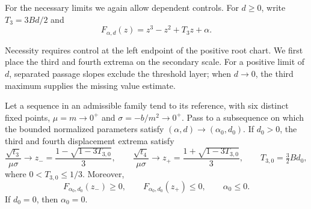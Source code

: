 For the necessary limits we again allow dependent controls.
For $d\ge0$, write $T_3=3Bd/2$ and
\[ F_{\alpha,d}(z)=z^3-z^2+T_3 z+\alpha. \]

Necessity requires control at the left endpoint of the positive root
chart. We first place the third and fourth extrema on the secondary
scale. For a positive limit of $d$, separated passage slopes exclude
the threshold layer; when $d\to0$, the third maximum supplies the missing
value estimate.

\begin{lemma}
\label{corner:limiting-critical-states}
Let a sequence in an admissible family tend to its reference,
with six distinct fixed points, $\mu=m\to0^+$ and
$\sigma=-b/m^2\to0^+$. Pass to a subsequence on which the bounded
normalized parameters satisfy $(\alpha,d)\to(\alpha_0,d_0)$.
If $d_0>0$, the third and fourth displacement extrema satisfy
\[
 \frac{\sqrt{t_3}}{\mu\sigma}\longrightarrow
 z_-=\frac{1-\sqrt{1-3T_{3,0}}}3,\qquad
 \frac{\sqrt{t_4}}{\mu\sigma}\longrightarrow
 z_+=\frac{1+\sqrt{1-3T_{3,0}}}3,
 \qquad T_{3,0}=\tfrac32Bd_0,
\]
where $0<T_{3,0}\leq1/3$.  Moreover,
\begin{equation}\label{corner:critical-value-inequalities}
 F_{\alpha_0,d_0}(z_-)\geq0,\qquad
 F_{\alpha_0,d_0}(z_+)\leq0,\qquad \alpha_0\leq0.
\end{equation}
If $d_0=0$, then $\alpha_0=0$.
\end{lemma}

